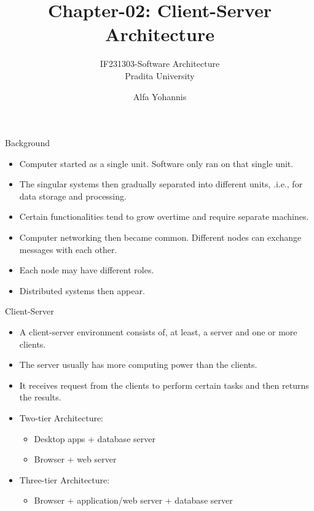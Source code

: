 \documentclass[aspectratio=169, table]{beamer}
\title{Chapter-02: Client-Server Architecture}
\subtitle{IF231303-Software Architecture\\Pradita University}
\author{Alfa Yohannis}
\begin{document}
	
	\begin{frame}[plain]
		\maketitle
	\end{frame}
	
	\begin{frame}{Background}
		\begin{itemize}
			\item Computer started as a single unit.  Software only ran on that single unit.
			\item The singular systems then gradually separated into different units, .i.e., for data storage and processing.
			\item Certain functionalities tend to grow overtime and require separate machines.
			\item Computer networking then became common. Different nodes can exchange messages with each other.
			\item Each node may have different roles.
			\item Distributed systems then appear.
		\end{itemize}
	\end{frame}
	
	\begin{frame}{Client-Server}
		\begin{itemize}
			\item A client-server environment consists of, at least, a server and one or more clients.
			\item The server usually has more computing power than the clients. 
			\item It receives request from the clients to perform certain tasks and then returns the results.
			\item Two-tier Architecture:
			\begin{itemize}
				\item Desktop apps + database server
				\item Browser + web server
			\end{itemize}
			\item Three-tier Architecture:
			\begin{itemize}
				\item Browser + application/web server + database server
			\end{itemize}
		\end{itemize}
	\end{frame}
	
\end{document}
